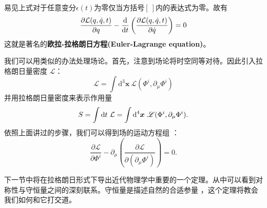 易见上式对于任意变分\(\epsilon(t)\)为零仅当方括号\([~]\)内的表达式为零。故有%
\begin{equation}
\frac{\partial \mathcal{L}(q,\dot q,t)}{\partial q} - \frac{\mathrm d}{\mathrm d t} \left( \frac{\partial \mathcal{L}(q,\dot q,t)}{\partial \dot q} \right)= 0
\label{equ4.7}
\end{equation}
这就是著名的{\bfseries 欧拉-拉格朗日方程(Euler-Lagrange equation)}。

我们可以用类似的办法处理场论。首先，注意到场论将时空同等对待。因此引入拉格朗日量密度 \(\mathscr{L}\)：
\begin{equation}
{\mathcal L} = \int{\mathrm d}^3\boldsymbol{x}~{\mathscr L}(\Phi^i,\partial_\mu \Phi^i)
\label{equ4.8}
\end{equation}
并用拉格朗日量密度来表示作用量
\begin{equation}
S = \int \mathrm d t~{\mathcal L} = \int{\mathrm d}^4\boldsymbol{x}~{\mathscr L}(\Phi^i,\partial_\mu \Phi^i).
\label{equ4.9}
\end{equation}
依照上面讲过的步骤，我们可以得到场的运动方程组%
%
：
\begin{equation}
\frac{\partial \mathscr{L}}{\partial \Phi^i} - \partial_\mu \left( \frac{\partial \mathscr{L}}{\partial (\partial_\mu \Phi^i)} \right)= 0.
\label{equ4.10}
\end{equation}

下一节中将在拉格朗日形式下导出近代物理学中重要的一个定理。从中可以看到对称性与守恒量之间的深刻联系。守恒量是描述自然的合适参量%
%
，这个定理将教会我们如何和它打交道。

